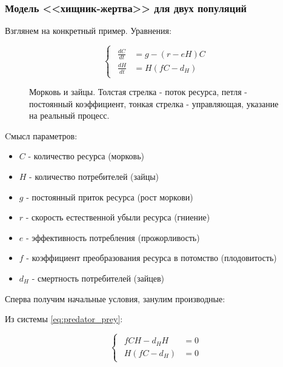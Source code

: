 \documentclass[a4paper, 14pt]{extarticle}
\begin{document}
\subsubsection{Модель <<хищник-жертва>> для двух популяций}

Взглянем на конкретный пример. Уравнения:

\begin{equation}
    \begin{cases}
        \begin{aligned}
    \frac{dC}{dt} &= g - (r - eH) C \\
    \frac{dH}{dt} &= H(fC - d_H)
        \end{aligned}
    \end{cases}
    \label{eq:predator_prey}
\end{equation}

\begin{figure}[H]
\centering

\caption{Морковь и зайцы. Толстая стрелка - поток ресурса, петля - постоянный коэффициент, тонкая стрелка - управляющая, указание на реальный процесс.}
\end{figure}

Cмысл параметров:

\begin{itemize}
    \item $C$ - количество ресурса (морковь)
    \item $H$ - количество потребителей (зайцы)  
    \item $g$ - постоянный приток ресурса (рост моркови)
    \item $r$ - скорость естественной убыли ресурса (гниение)
    \item $e$ - эффективность потребления (прожорливость)
    \item $f$ - коэффициент преобразования ресурса в потомство (плодовитость)
    \item $d_H$ - смертность потребителей (зайцев)
\end{itemize}

Сперва получим начальные условия, занулим производные:

Из системы \eqref{eq:predator_prey}:

\begin{equation}
    \begin{cases}
        \begin{aligned}
            f C H - d_H H &= 0 \\
            H(f C - d_H) &= 0
        \end{aligned}
    \end{cases}
    \label{eq:steady_state}
\end{equation}
\end{document}

